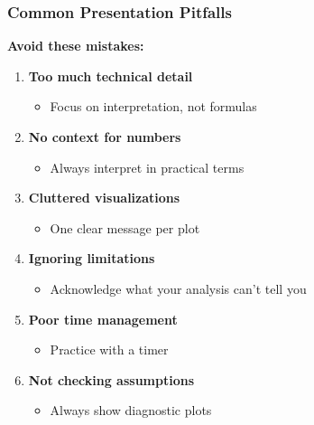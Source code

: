 \documentclass{beamer}
\begin{document}
\begin{frame}
\frametitle{Common Presentation Pitfalls}
\textbf{Avoid these mistakes:}

\vspace{0.3cm}
\begin{enumerate}
\item \textbf{Too much technical detail}
  \begin{itemize}
  \item Focus on interpretation, not formulas
  \end{itemize}

\item \textbf{No context for numbers}
  \begin{itemize}
  \item Always interpret in practical terms
  \end{itemize}

\item \textbf{Cluttered visualizations}
  \begin{itemize}
  \item One clear message per plot
  \end{itemize}

\item \textbf{Ignoring limitations}
  \begin{itemize}
  \item Acknowledge what your analysis can't tell you
  \end{itemize}

\item \textbf{Poor time management}
  \begin{itemize}
  \item Practice with a timer
  \end{itemize}

\item \textbf{Not checking assumptions}
  \begin{itemize}
  \item Always show diagnostic plots
  \end{itemize}
\end{enumerate}
\end{frame}
\end{document}
